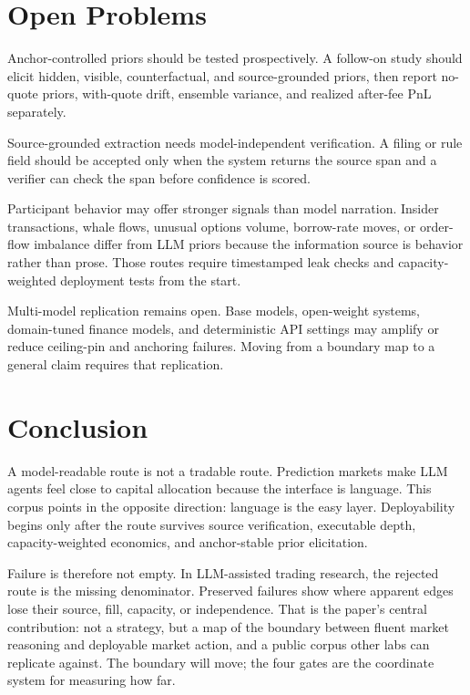 \documentclass[11pt]{article}
\begin{document}
\section{Open Problems}

Anchor-controlled priors should be tested prospectively. A follow-on study should elicit hidden, visible, counterfactual, and source-grounded priors, then report no-quote priors, with-quote drift, ensemble variance, and realized after-fee PnL separately.

Source-grounded extraction needs model-independent verification. A filing or rule field should be accepted only when the system returns the source span and a verifier can check the span before confidence is scored.

Participant behavior may offer stronger signals than model narration. Insider transactions, whale flows, unusual options volume, borrow-rate moves, or order-flow imbalance differ from LLM priors because the information source is behavior rather than prose. Those routes require timestamped leak checks and capacity-weighted deployment tests from the start.

Multi-model replication remains open. Base models, open-weight systems, domain-tuned finance models, and deterministic API settings may amplify or reduce ceiling-pin and anchoring failures. Moving from a boundary map to a general claim requires that replication.

\section{Conclusion}

A model-readable route is not a tradable route. Prediction markets make LLM agents feel close to capital allocation because the interface is language. This corpus points in the opposite direction: language is the easy layer. Deployability begins only after the route survives source verification, executable depth, capacity-weighted economics, and anchor-stable prior elicitation.

Failure is therefore not empty. In LLM-assisted trading research, the rejected route is the missing denominator. Preserved failures show where apparent edges lose their source, fill, capacity, or independence. That is the paper's central contribution: not a strategy, but a map of the boundary between fluent market reasoning and deployable market action, and a public corpus other labs can replicate against. The boundary will move; the four gates are the coordinate system for measuring how far.
\end{document}

